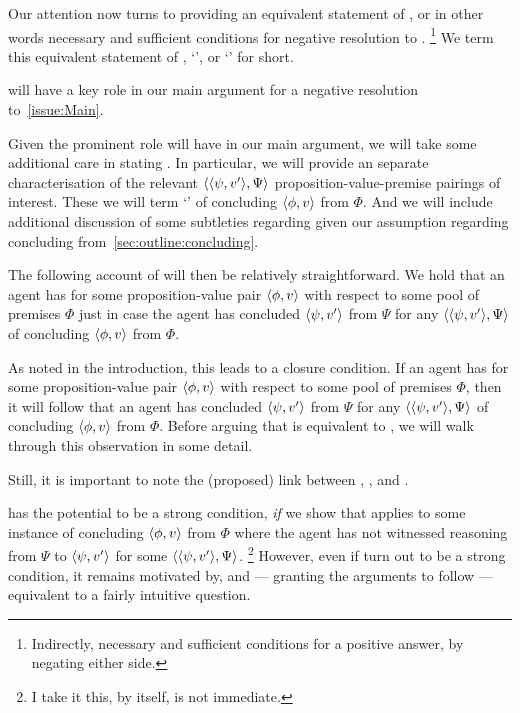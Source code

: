 \begin{note}
  Our attention now turns to providing an equivalent statement of \zS{}, or in other words necessary and sufficient conditions for negative resolution to \qzS{}.%
  \footnote{
    Indirectly, necessary and sufficient conditions for a positive answer, by negating either side.
  }
  We term this equivalent statement of \zS{}, `\ZS{-}', or `\ZS{}' for short.

  \ZS{} will have a key role in our main argument for a negative resolution to~\autoref{issue:Main}.

  Given the prominent role \ZS{} will have in our main argument, we will take some additional care in stating \ZS{}.
  In particular, we will provide an separate characterisation of the relevant \(\langle \langle \psi, v' \rangle, \Psi \rangle\) proposition-value-premise pairings of interest.
  These we will term `' of concluding \(\langle \phi, v \rangle\) from \(\Phi\).
  And we will include additional discussion of some subtleties regarding  given our assumption regarding concluding from~\autoref{sec:outline:concluding}.

  The following account of \ZS{} will then be relatively straightforward.
  We hold that an agent has \ZS{} for some proposition-value pair \(\langle \phi, v \rangle\) with respect to some pool of premises \(\Phi\) just in case the agent has concluded \(\langle \psi, v' \rangle\) from \(\Psi\) for any \requ{} \(\langle \langle \psi, v' \rangle, \Psi \rangle\) of concluding \(\langle \phi, v \rangle\) from \(\Phi\).

  As noted in the introduction, this leads to a closure condition.
  If an agent has \ZS{} for some proposition-value pair \(\langle \phi, v \rangle\) with respect to some pool of premises \(\Phi\), then it will follow that an agent has concluded \(\langle \psi, v' \rangle\) from \(\Psi\) for any \requ{} \(\langle \langle \psi, v' \rangle, \Psi \rangle\) of concluding \(\langle \phi, v \rangle\) from \(\Phi\).
  Before arguing that \ZS{} is equivalent to \zS{}, we will walk through this observation in some detail.
\end{note}

\begin{note}
  Still, it is important to note the (proposed) link between \qzS{}, \zS{}, and \ZS{}.

  \ZS{} has the potential to be a strong condition, \emph{if} we show that \ZS{} applies to some instance of concluding \(\langle \phi, v \rangle\) from \(\Phi\) where the agent has not witnessed reasoning from \(\Psi\) to \(\langle \psi, v' \rangle\) for some \requ{} \(\langle \langle \psi, v' \rangle, \Psi \rangle\).%
  \footnote{
    I take it this, by itself, is not immediate.
  }
  However, even if \ZS{} turn out to be a strong condition, it remains motivated by, and --- granting the arguments to follow --- equivalent to a fairly intuitive question.
\end{note}


